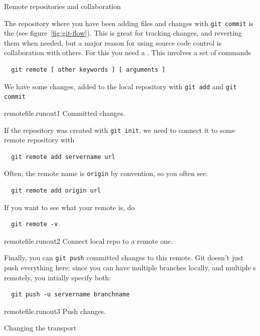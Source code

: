 \newpage
{} {Remote repositories and collaboration}
\label{sec:git-remote}

The repository where you have been adding files and changes with
\lstinline{git commit} is the 
(see figure~\ref{fig:git-flow}).
This is great for tracking changes, and reverting them when needed,
but a major reason for using source code control is collaboration
with others.
For this you need a .
This involves a set of commands
\begin{lstlisting}
  git remote [ other keywords ] [ arguments ]
\end{lstlisting}

We have some changes, added to the local repository
with \lstinline{git add} and \lstinline{git commit}

\begin{gitstep}{remotefile.runout1}
  Committed changes.
\end{gitstep}

If the repository was created with \lstinline{git init},
we need to connect it to some remote repository with
\begin{lstlisting}
  git remote add servername url
\end{lstlisting}
Often, the remote name is \lstinline{origin} by convention,
so you often see:
\begin{lstlisting}
  git remote add origin url
\end{lstlisting}
If you want to see what your remote is, do
\begin{lstlisting}
  git remote -v
\end{lstlisting}


\begin{gitstep}{remotefile.runout2}
  Connect local repo to a remote one.
\end{gitstep}

Finally, you can \lstinline{git push} committed changes to this remote.
Git doesn't just push everything here: since you can have multiple branches locally,
and multiple s remotely, you intially specify both:
\begin{lstlisting}
  git push -u servername branchname
\end{lstlisting}

\begin{gitstep}{remotefile.runout3}
  Push changes.
\end{gitstep}

\newpage
{} {Changing the transport}

